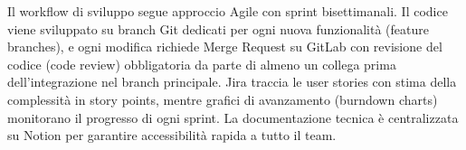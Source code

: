 Il workflow di sviluppo segue approccio Agile con sprint bisettimanali. Il 
codice viene sviluppato su branch Git dedicati per ogni nuova funzionalità 
(feature branches), e ogni modifica richiede Merge Request su GitLab con 
revisione del codice (code review) obbligatoria da parte di almeno un 
collega prima dell'integrazione nel branch principale. Jira traccia le user 
stories con stima della complessità in story points, mentre grafici di 
avanzamento (burndown charts) monitorano il progresso di ogni sprint. La 
documentazione tecnica è centralizzata su Notion per garantire accessibilità 
rapida a tutto il team.